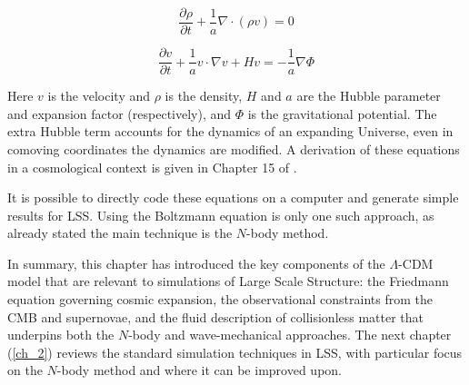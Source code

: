 \begin{equation}
\label{eqn_fluid}
\frac{\partial \rho}{\partial t} + \frac{1}{a} \nabla \cdot (\rho v) = 0
\end{equation}

\begin{equation}
\frac{\partial v}{\partial t} + \frac{1}{a} v \cdot \nabla v + H v = - \frac{1}{a} \nabla \Phi
\end{equation}

\noindent Here $v$ is the velocity and $\rho$ is the density, $H$ and $a$ are the Hubble parameter and expansion factor (respectively), and $\Phi$ is the gravitational potential. The extra Hubble term accounts for the dynamics of an expanding Universe, even in comoving coordinates the dynamics are modified. A derivation of these equations in a cosmological context is given in Chapter 15 of \citet{bib_pea}.

It is possible to directly code these equations on a computer and generate simple results for LSS. Using the Boltzmann equation is only one such approach, as already stated the main technique is the $N$-body method.

In summary, this chapter has introduced the key components of the $\Lambda$-CDM model that are relevant to simulations of Large Scale Structure: the Friedmann equation governing cosmic expansion, the observational constraints from the CMB and supernovae, and the fluid description of collisionless matter that underpins both the $N$-body and wave-mechanical approaches. The next chapter (\ref{ch_2}) reviews the standard simulation techniques in LSS, with particular focus on the $N$-body method and where it can be improved upon.



